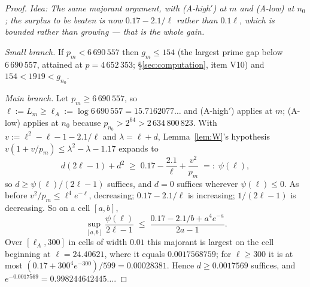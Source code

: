 \documentclass[11pt,a4paper]{article}
\theoremstyle{plain}
\theoremstyle{definition}
\theoremstyle{remark}
\newcommand{\idea}[1]{\emph{Idea: #1}\par\smallskip}
\begin{document}
\begin{proof}
\idea{The same majorant argument, with (A-high$'$) at $m$ and (A-low) at $n_0$; the surplus to
be beaten is now $0.17 - 2.1/\ell$ rather than $0.1\ell$, which is bounded rather than
growing --- that is the whole gain.}
\emph{Small branch.} If $p_m < 6\,690\,557$ then $g_m \le 154$ (the largest prime gap below
$6\,690\,557$, attained at $p = 4\,652\,353$; \S\ref{sec:computation}, item V10) and
$154 < 1919 < g_{n_0}$.

\emph{Main branch.} Let $p_m \ge 6\,690\,557$, so $\ell := L_m \ge \ell_A := \log 6\,690\,557
= 15.7162077\ldots$ and (A-high$'$) applies at $m$; (A-low) applies at $n_0$ because
$p_{n_0} > 2^{64} > 2\,634\,800\,823$. With $v := \ell^2 - \ell - 1 - 2.1/\ell$ and
$\lambda = \ell + d$, Lemma~\ref{lem:W}'s hypothesis
$v(1 + v/p_m) \le \lambda^2 - \lambda - 1.17$ expands to
\[
d(2\ell - 1) + d^2 \;\ge\; 0.17 - \frac{2.1}{\ell} + \frac{v^2}{p_m} \;=:\; \psi(\ell) ,
\]
so $d \ge \psi(\ell)/(2\ell-1)$ suffices, and $d = 0$ suffices wherever $\psi(\ell) \le 0$. As
before $v^2/p_m \le \ell^4e^{-\ell}$, decreasing; $0.17 - 2.1/\ell$ is increasing;
$1/(2\ell-1)$ is decreasing. So on a cell $[a,b]$,
\[
\sup_{[a,b]} \frac{\psi(\ell)}{2\ell-1} \;\le\;
\frac{0.17 - 2.1/b + a^4e^{-a}}{2a - 1} .
\]
Over $[\ell_A, 300]$ in cells of width $0.01$ this majorant is largest on the cell beginning at
$\ell = 24.40621$, where it equals $0.0017568759$; for $\ell \ge 300$ it is at most
$(0.17 + 300^4e^{-300})/599 = 0.00028381$. Hence $d \ge 0.0017569$ suffices, and
$e^{-0.0017569} = 0.998244642445\ldots$.
\end{proof}
\end{document}
